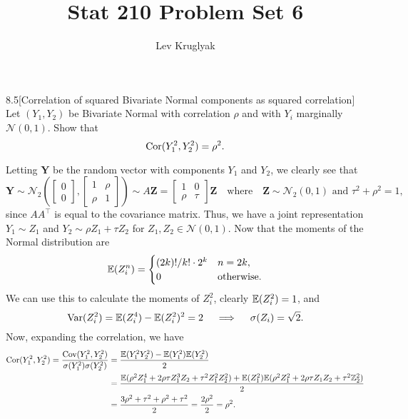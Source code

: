 \documentclass{pset}
\title{Stat 210 Problem Set 6}
\author{Lev Kruglyak}
\begin{document}
\maketitle
\collaborators

\begin{problem}{8.5}[Correlation of squared Bivariate Normal components as squared correlation] Let $(Y_1, Y_2)$ be Bivariate Normal with correlation $\rho$ and with $Y_i$ marginally $\mathcal{N}(0,1)$. Show that
  \[\textrm{Cor}(Y_1^2, Y_2^2) = \rho^2.\]
\end{problem}

\begin{solution}
  Letting $\mathbf{Y}$ be the random vector with components $Y_1$ and $Y_2$, we clearly see that
  \[
    \mathbf{Y}\sim \mathcal{N}_2\left(\begin{bmatrix}0\\0\end{bmatrix}, \begin{bmatrix}1&\rho\\ \rho&1\end{bmatrix}\right) \sim A\mathbf{Z}=\begin{bmatrix}1&0\\\rho&\tau\end{bmatrix}\mathbf{Z}\quad\textrm{where}\quad \mathbf{Z}\sim \mathcal{N}_2(0,1) \textrm{ and }\tau^2+\rho^2=1,
  \]
  since $AA^\intercal$ is equal to the covariance matrix. Thus, we have a joint representation $Y_1\sim Z_1$ and $Y_2\sim \rho Z_1+\tau Z_2$ for $Z_1,Z_2\in \mathcal{N}(0,1)$. Now that the moments of the Normal distribution are
  \[
    \mathbb{E}(Z_i^{n}) = \begin{cases}(2k)!/k!\cdot 2^{k} & n=2k,\\ 0&\textrm{otherwise}.\end{cases}
  \]
  We can use this to calculate the moments of $Z_i^2$, clearly $\mathbb{E}(Z_i^2) = 1$, and
  \[
    \textrm{Var}(Z_i^2) = \mathbb{E}(Z_i^4)-\mathbb{E}(Z_i^2)^2 = 2 \quad\implies\quad \sigma(Z_i)=\sqrt{2}.
  \]
  Now, expanding the correlation, we have
  \[
    \begin{aligned}
      \textrm{Cor}(Y_1^2,Y_2^2) = \frac{\textrm{Cov}(Y_1^2, Y_2^2)}{\sigma(Y_1^2)\sigma(Y_2^2)} &= \frac{\mathbb{E}(Y_1^2Y_2^2) - \mathbb{E}(Y_1^2)\mathbb{E}(Y_2^2)}{2}\\ &= \frac{\mathbb{E}(\rho^2 Z_1^4+2\rho\tau Z_1^3Z_2+\tau^2 Z_1^2Z_2^2) + \mathbb{E}(Z_1^2)\mathbb{E}(\rho^2Z_1^2+2\rho\tau Z_1Z_2+\tau^2\mathbb{Z}_2^2)}{2}\\ &=\frac{3\rho^2+\tau^2+\rho^2+\tau^2}{2} = \frac{2\rho^2}{2}=\rho^2.
    \end{aligned}
  \]
\end{solution}
\end{document}
